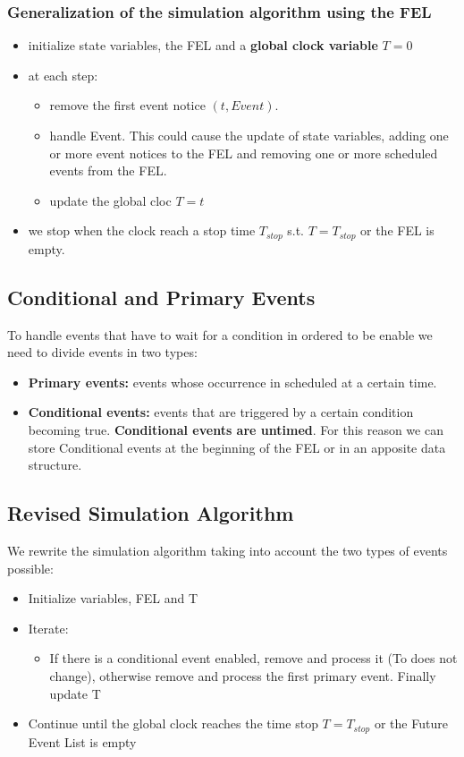 \subsubsection{Generalization of the simulation algorithm using the FEL}
\begin{itemize}
    \item initialize state variables, the FEL and a \textbf{global clock variable} $T = 0$
    \item at each step:
        \begin{itemize}
            \item remove the first event notice $(t, Event)$.
            \item handle Event. This could cause the update of state variables, adding one or more event notices to the FEL and removing one or more scheduled events from the FEL.
            \item update the global cloc $T = t$
        \end{itemize}

    \item we stop when the clock reach a stop time $T_{stop}$ s.t. $T = T_{stop}$ or the FEL is empty. 
\end{itemize}

\subsection{Conditional and Primary Events}
To handle events that have to wait for a condition in ordered to be enable we need to divide events in two types:

\begin{itemize}
    \item \textbf{Primary events:} events whose occurrence in scheduled at a certain time.
    \item \textbf{Conditional events:} events that are triggered by a certain condition becoming true. \textbf{Conditional events are untimed}. For this reason we can store Conditional events at the beginning of the FEL or in an apposite data structure.
\end{itemize}

\subsection{Revised Simulation Algorithm}
We rewrite the simulation algorithm taking into account the two types of events possible:
\begin{itemize}
    \item Initialize variables, FEL and T
    \item Iterate:
        \begin{itemize}
            \item If there is a conditional event enabled, remove and process it (To does not change), otherwise remove and process the first primary event. Finally update T
        \end{itemize}
    \item Continue until the global clock reaches the time stop $T = T_{stop}$ or the Future Event List is empty 
\end{itemize}

